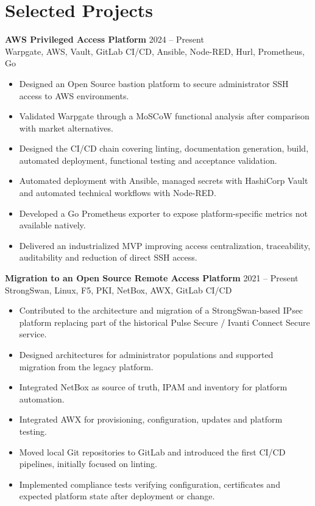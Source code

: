 \documentclass[10pt,a4paper]{article}
\newcommand{\project}[3]{
  \textbf{#1} \hfill {\color{muted}#2}\\
  {\color{muted}#3}
}
\begin{document}
\section{Selected Projects}

\project{AWS Privileged Access Platform}{2024 -- Present}{Warpgate, AWS, Vault, GitLab CI/CD, Ansible, Node-RED, Hurl, Prometheus, Go}
\begin{itemize}
  \item Designed an Open Source bastion platform to secure administrator SSH access to AWS environments.
  \item Validated Warpgate through a MoSCoW functional analysis after comparison with market alternatives.
  \item Designed the CI/CD chain covering linting, documentation generation, build, automated deployment, functional testing and acceptance validation.
  \item Automated deployment with Ansible, managed secrets with HashiCorp Vault and automated technical workflows with Node-RED.
  \item Developed a Go Prometheus exporter to expose platform-specific metrics not available natively.
  \item Delivered an industrialized MVP improving access centralization, traceability, auditability and reduction of direct SSH access.
\end{itemize}

\vspace{4pt}
\project{Migration to an Open Source Remote Access Platform}{2021 -- Present}{StrongSwan, Linux, F5, PKI, NetBox, AWX, GitLab CI/CD}
\begin{itemize}
  \item Contributed to the architecture and migration of a StrongSwan-based IPsec platform replacing part of the historical Pulse Secure / Ivanti Connect Secure service.
  \item Designed architectures for administrator populations and supported migration from the legacy platform.
  \item Integrated NetBox as source of truth, IPAM and inventory for platform automation.
  \item Integrated AWX for provisioning, configuration, updates and platform testing.
  \item Moved local Git repositories to GitLab and introduced the first CI/CD pipelines, initially focused on linting.
  \item Implemented compliance tests verifying configuration, certificates and expected platform state after deployment or change.
\end{itemize}
\end{document}
